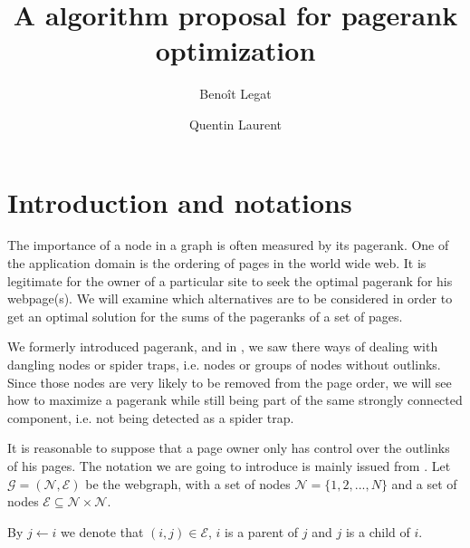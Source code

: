 \documentclass{article}
\author{Benoît Legat \and Quentin Laurent}
\title{A algorithm proposal for pagerank optimization}
\newcommand{\1}{\mathbf{1}}
\theoremstyle{definition}
\begin{document}
\maketitle

\section{Introduction and notations}
The importance of a node in a graph is often measured by its pagerank. One of the application domain is the ordering of pages in the world wide web. It is legitimate for the owner of a particular site to seek the optimal pagerank for his webpage(s). We will examine which alternatives are to be considered in order to get an optimal solution for the sums of the pageranks of a set of pages.

We formerly introduced pagerank, and in \cite{leskovec}, we saw there ways of dealing with dangling nodes or spider traps, i.e. nodes or groups of nodes without outlinks. Since those nodes are very likely to be removed from the page order, we will see how to maximize a pagerank while still being part of the same strongly connected component, i.e. not being detected as a spider trap.

It is reasonable to suppose that a page owner only has control over the outlinks of his pages. The notation we are going to introduce is mainly issued from \cite{de2008maximizing}.
Let \(\mathcal{G} = (\mathcal{N},\mathcal{E})\) be the webgraph, with a set of nodes  \(\mathcal{N} = \{1,2,...,N\}\) and a set of nodes \(\mathcal{E}\subseteq \mathcal{N}\times \mathcal{N}\).

By \(j \leftarrow i\) we denote that \((i,j)\in \mathcal{E}\), \(i\) is a parent of \(j\) and \(j\) is a child of \(i\).
\end{document}
